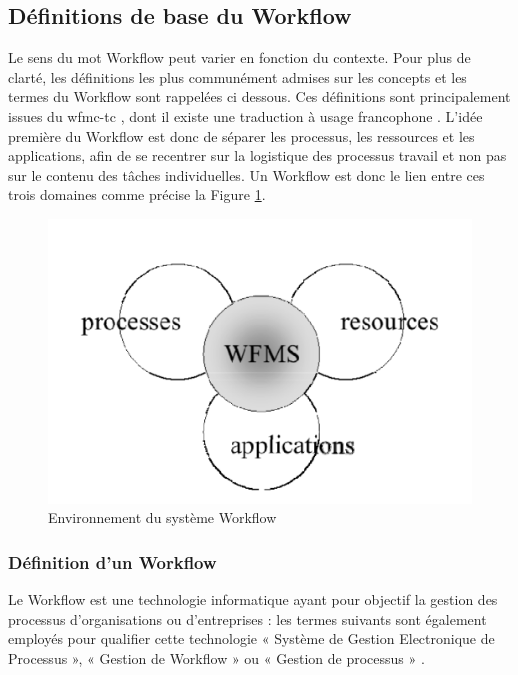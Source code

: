  	\subsection{Définitions de base du Workflow } 
 	 
 	 Le sens du mot Workflow peut varier en fonction du contexte. Pour plus de clarté, les définitions les plus communément admises sur les concepts et les termes du Workflow sont rappelées ci dessous. Ces définitions sont principalement issues du \ac{wfmc-tc} \parencite{WFMC11}, dont il existe une traduction à usage francophone \parencite{WFMC11}. L’idée première du Workflow est donc de séparer les processus, les ressources et les applications, afin de se recentrer sur la logistique des processus travail et non pas sur le contenu des tâches individuelles. Un Workflow est donc le lien entre ces trois domaines comme précise la Figure \ref{fig:environnementswf}. 
 	 
 	 
 	 
 	 
 	 
 	 
 	 
\begin{figure}[H]
	\centering
	\includegraphics[width=0.6\linewidth]{images/Environnementswf}
	\caption{ Environnement du système Workflow}
	\label{fig:environnementswf}
\end{figure}
 	 
 	 
 	 
 	 
 	 \subsubsection{Définition d’un Workflow }
 	 
 	 
 	 Le Workflow est une technologie informatique ayant pour objectif la gestion des processus d’organisations ou d’entreprises : les termes suivants sont également employés pour qualifier cette technologie « Système de Gestion Electronique de Processus », « Gestion de Workflow » ou « Gestion de processus » \parencite{Courtois}. 
 	 
